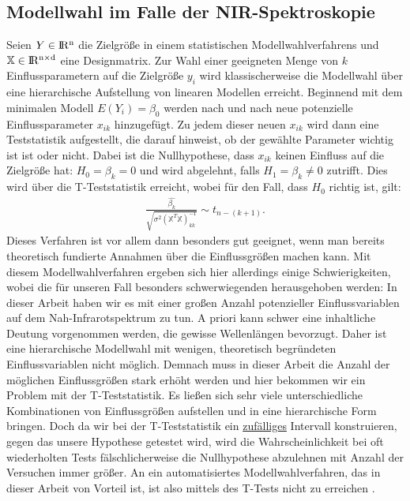 	\subsection{Modellwahl im Falle der NIR-Spektroskopie}
	\label{ssec:mlr}
	Seien $Y\in \rm I\!R^{n}$ die Zielgröße in einem statistischen Modellwahlverfahrens und $\mathbb{X} \in \rm I\!R^{n \times d}$ eine Designmatrix.
	Zur Wahl einer geeigneten Menge von $k$ Einflussparametern auf die Zielgröße $y_i$  wird klassischerweise die Modellwahl über eine hierarchische Aufstellung von linearen Modellen erreicht. Beginnend mit dem minimalen Modell $E(Y_i) = \beta_0$ werden nach und nach neue potenzielle Einflussparameter $x_{ik}$ hinzugefügt. Zu jedem dieser neuen $x_{ik}$ wird dann eine Teststatistik aufgestellt, die darauf hinweist, ob der gewählte Parameter wichtig ist ist oder nicht. Dabei ist die Nullhypothese, dass $x_{ik}$ keinen Einfluss auf die Zielgröße hat: $ H_0 = \beta_k = 0$ und wird abgelehnt, falls $H_1 = \beta_k \neq 0$ zutrifft.
	Dies wird über die T-Teststatistik erreicht,  wobei für den Fall, dass $H_0$ richtig ist, gilt:
	\begin{align*}
	\frac{\hat{\beta_k}}{\sqrt{\sigma^2(\mathbb{X}^T\mathbb{X})^{-1}_{kk}}} \sim t_{n-(k+1)}.
	\end{align*}
	Dieses Verfahren ist vor allem dann besonders gut geeignet, wenn man bereits theoretisch fundierte Annahmen über die Einflussgrößen machen kann.
	Mit diesem Modellwahlverfahren ergeben sich hier allerdings einige Schwierigkeiten, wobei die für unseren Fall besonders schwerwiegenden herausgehoben werden: In dieser Arbeit haben wir es mit einer großen Anzahl potenzieller Einflussvariablen auf dem Nah-Infrarotspektrum zu tun. A priori kann schwer eine inhaltliche Deutung vorgenommen werden, die gewisse Wellenlängen bevorzugt. Daher ist eine hierarchische Modellwahl mit wenigen, theoretisch begründeten Einflussvariablen nicht möglich. Demnach muss in dieser Arbeit die Anzahl der möglichen Einflussgrößen stark erhöht werden und hier bekommen wir ein Problem mit der T-Teststatistik. Es ließen sich sehr viele unterschiedliche Kombinationen von Einflussgrößen aufstellen und in eine hierarchische Form bringen. Doch da wir bei der T-Teststatistik ein \underline{zufälliges} Intervall konstruieren, gegen das unsere Hypothese getestet wird, wird die Wahrscheinlichkeit bei oft wiederholten Tests fälschlicherweise die Nullhypothese abzulehnen mit Anzahl der Versuchen immer größer. An ein automatisiertes Modellwahlverfahren, das in dieser Arbeit von Vorteil ist, ist also mittels des T-Tests nicht zu erreichen \cite{Schumacher.2019}.
